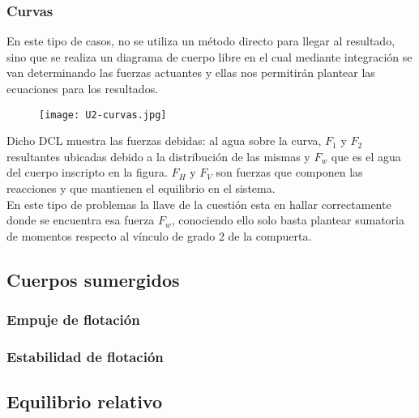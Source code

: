 \subsubsection{Curvas}
En este tipo de casos, no se utiliza un método directo para llegar al resultado, sino que se realiza un diagrama de cuerpo libre en el cual mediante integración se van determinando las fuerzas actuantes y ellas nos permitirán plantear las ecuaciones para los resultados.
\begin{figure}[h]
	\centering
	\texttt{[image: U2-curvas.jpg]}
\end{figure}
Dicho DCL muestra las fuerzas debidas: al agua sobre la curva, $F_{1}$ y $F_{2}$ resultantes ubicadas debido a la distribución de las mismas y $F_{w}$ que es el agua del cuerpo inscripto en la figura. $F_{H}$ y $F_{V}$ son fuerzas que componen las reacciones y que mantienen el equilibrio en el sistema.\\
En este tipo de problemas la llave de la cuestión esta en hallar correctamente donde se encuentra esa fuerza $F_{w}$, conociendo ello solo basta plantear sumatoria de momentos respecto al vínculo de grado 2 de la compuerta.\\
\subsection{Cuerpos sumergidos}

\subsubsection{Empuje de flotación}

\subsubsection{Estabilidad de flotación}

\subsection{Equilibrio relativo}	

